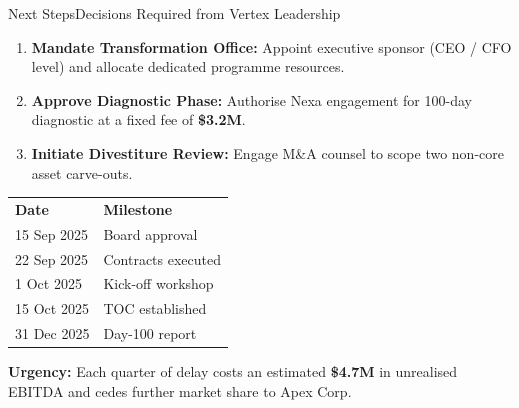 \begin{frame}{Next Steps}{Decisions Required from Vertex Leadership}
  \vspace{0.2cm}
  \begin{minipage}[t]{0.48\textwidth}
    \begin{tcolorbox}[nexacard, title={\faFlag\; Immediate Decisions}]
      \small
      \begin{enumerate}\setlength\itemsep{4pt}
        \item \textbf{Mandate Transformation Office:}
              Appoint executive sponsor (CEO / CFO level)
              and allocate dedicated programme resources.
        \item \textbf{Approve Diagnostic Phase:}
              Authorise Nexa engagement for 100-day
              diagnostic at a fixed fee of \textbf{\$3.2M}.
        \item \textbf{Initiate Divestiture Review:}
              Engage M\&A counsel to scope two
              non-core asset carve-outs.
      \end{enumerate}
    \end{tcolorbox}
  \end{minipage}\hfill
  \begin{minipage}[t]{0.48\textwidth}
    \begin{tcolorbox}[nexacard, title={\faClock\; Timeline to Mobilise}]
      \small
      \begin{tabular}{@{}ll}
        \textbf{Date} & \textbf{Milestone} \\[3pt]
        15 Sep 2025  & Board approval      \\
        22 Sep 2025  & Contracts executed  \\
        1 Oct 2025   & Kick-off workshop   \\
        15 Oct 2025  & TOC established     \\
        31 Dec 2025  & Day-100 report      \\
      \end{tabular}
    \end{tcolorbox}
    \par\medskip
    \begin{tcolorbox}[nexahighlight]
      \scriptsize\textbf{\faExclamationTriangle\; Urgency:}
      Each quarter of delay costs an estimated
      \textbf{\$4.7M} in unrealised EBITDA and
      cedes further market share to Apex Corp.
    \end{tcolorbox}
  \end{minipage}
\end{frame}

